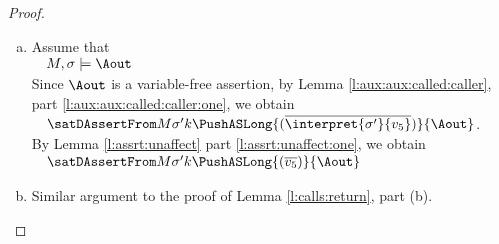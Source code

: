 \begin{proof}$ ~ $


\begin{enumerate}[a.]
\item
Assume that \\
$\strut \ \ \ M, \sigma \models  {\Aout}$\\
Since $\Aout$ is a variable-free assertion,  by   Lemma \ref{l:aux:aux:called:caller}, part \ref{l:aux:aux:called:caller:one}, we obtain\\  
$\strut \ \ \ \satDAssertFrom M  {\sigma'} k   {\PushASLong  {(\overline {\interpret {\sigma'} {v_5}})}    {\Aout}}$.\\
By Lemma \ref{l:assrt:unaffect} part \ref{l:assrt:unaffect:one},  we obtain \\
$\strut \ \ \ \satDAssertFrom M  {\sigma'} k  {\PushASLong  {(\overline {v_5})}    {\Aout}}$
\item
Similar argument to the proof of Lemma \ref{l:calls:return}, part (b).
\end{enumerate}

\end{proof}



